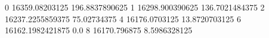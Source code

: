 0 16359.08203125 196.8837890625
1 16298.900390625 136.7021484375
2 16237.2255859375 75.02734375
4 16176.0703125 13.8720703125
6 16162.1982421875 0.0
8 16170.796875 8.5986328125
